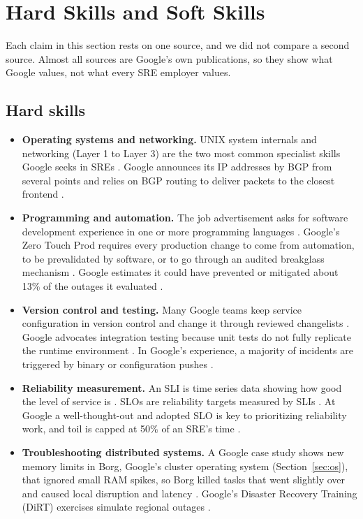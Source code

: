 \section{Hard Skills and Soft Skills}

Each claim in this section rests on one source, and we did not compare a second source. Almost all sources are Google's own publications, so they show what Google values, not what every SRE employer values.

\subsection{Hard skills}
\begin{itemize}
  \item \textbf{Operating systems and networking.} UNIX system internals and networking (Layer 1 to Layer 3) are the two most common specialist skills Google seeks in SREs \cite{sre-book}. Google announces its IP addresses by BGP from several points and relies on BGP routing to deliver packets to the closest frontend \cite{workbook}.
  \item \textbf{Programming and automation.} The job advertisement asks for software development experience in one or more programming languages \cite{google-about-careers-applications-jobs-results-121141635160384198-software-engineer-android-sre}. Google's Zero Touch Prod requires every production change to come from automation, to be prevalidated by software, or to go through an audited breakglass mechanism \cite{bsrs}. Google estimates it could have prevented or mitigated about 13\% of the outages it evaluated \cite{bsrs}.
  \item \textbf{Version control and testing.} Many Google teams keep service configuration in version control and change it through reviewed changelists \cite{workbook}. Google advocates integration testing because unit tests do not fully replicate the runtime environment \cite{static-pdf-lessonslearnedfromtwodecades-pdf}. In Google's experience, a majority of incidents are triggered by binary or configuration pushes \cite{workbook}.
  \item \textbf{Reliability measurement.} An SLI is time series data showing how good the level of service is \cite{sre-articles}. SLOs are reliability targets measured by SLIs \cite{sre-articles}. At Google a well-thought-out and adopted SLO is key to prioritizing reliability work, and toil is capped at 50\% of an SRE's time \cite{workbook}.
  \item \textbf{Troubleshooting distributed systems.} A Google case study shows new memory limits in Borg, Google's cluster operating system (Section~\ref{sec:os}), that ignored small RAM spikes, so Borg killed tasks that went slightly over and caused local disruption and latency \cite{static-pdf-casestudiesinfrastructurechangemanagement-pdf}. Google's Disaster Recovery Training (DiRT) exercises simulate regional outages \cite{workbook}.
\end{itemize}

